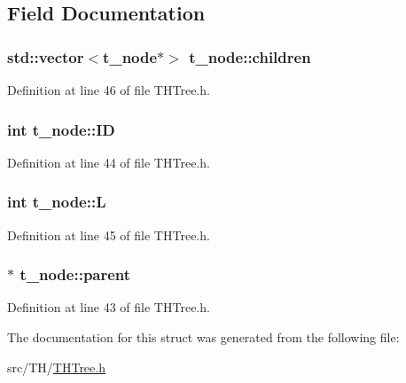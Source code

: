 \subsection{Field Documentation}
\subsubsection[{\texorpdfstring{children}{children}}]{\setlength{\rightskip}{0pt plus 5cm}std\+::vector$<${\bf t\+\_\+node}$\ast$$>$ t\+\_\+node\+::children}\hypertarget{structt__node_a1fa40826359a9299ee462688e5754378}{}\label{structt__node_a1fa40826359a9299ee462688e5754378}


Definition at line 46 of file T\+H\+Tree.\+h.

\subsubsection[{\texorpdfstring{ID}{ID}}]{\setlength{\rightskip}{0pt plus 5cm}int t\+\_\+node\+::\+ID}\hypertarget{structt__node_ad9c1c64db61864861f59b1c6afb74bc0}{}\label{structt__node_ad9c1c64db61864861f59b1c6afb74bc0}


Definition at line 44 of file T\+H\+Tree.\+h.

\subsubsection[{\texorpdfstring{L}{L}}]{\setlength{\rightskip}{0pt plus 5cm}int t\+\_\+node\+::L}\hypertarget{structt__node_a969f3a8447460a76d0aaf85648a02150}{}\label{structt__node_a969f3a8447460a76d0aaf85648a02150}


Definition at line 45 of file T\+H\+Tree.\+h.

\subsubsection[{\texorpdfstring{parent}{parent}}]{$\ast$ t\+\_\+node\+::parent}\hypertarget{structt__node_a5a23987dec53ba900f26d5a3b031b2f0}{}\label{structt__node_a5a23987dec53ba900f26d5a3b031b2f0}


Definition at line 43 of file T\+H\+Tree.\+h.



The documentation for this struct was generated from the following file\+:\begin{DoxyCompactItemize}
\item 
src/\+T\+H/\hyperlink{THTree_8h}{T\+H\+Tree.\+h}\end{DoxyCompactItemize}
